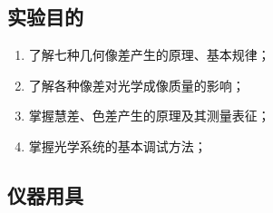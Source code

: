 \documentclass[dvipsnames, svgnames,a4paper,11pt]{article}
\begin{document}
\subsection{实验目的}
	\begin{enumerate}
		\item 了解七种几何像差产生的原理、基本规律；
		\item 了解各种像差对光学成像质量的影响；
		\item 掌握慧差、色差产生的原理及其测量表征； 
		\item 掌握光学系统的基本调试方法；
		
		
		
	\end{enumerate}

\subsection{仪器用具}
\end{document}
